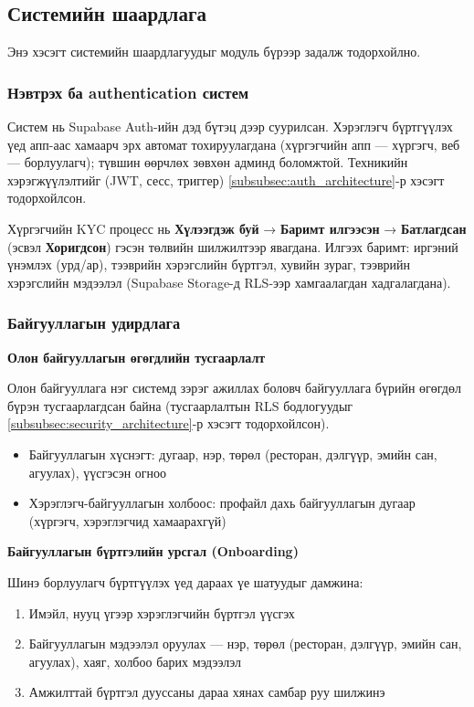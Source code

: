 \subsection{Системийн шаардлага}
\label{subsec:functional_requirements}

Энэ хэсэгт системийн шаардлагуудыг модуль бүрээр задалж тодорхойлно.

\subsubsection{Нэвтрэх ба authentication систем}

Систем нь Supabase Auth-ийн дэд бүтэц дээр суурилсан. Хэрэглэгч бүртгүүлэх үед апп-аас хамаарч эрх автомат тохируулагдана (хүргэгчийн апп — хүргэгч, веб — борлуулагч); түвшин өөрчлөх зөвхөн админд боломжтой. Техникийн хэрэгжүүлэлтийг (JWT, сесс, триггер) \ref{subsubsec:auth_architecture}-р хэсэгт тодорхойлсон.

Хүргэгчийн KYC процесс нь \textbf{Хүлээгдэж буй} → \textbf{Баримт илгээсэн} → \textbf{Батлагдсан} (эсвэл \textbf{Хоригдсон}) гэсэн төлвийн шилжилтээр явагдана. Илгээх баримт: иргэний үнэмлэх (урд/ар), тээврийн хэрэгслийн бүртгэл, хувийн зураг, тээврийн хэрэгслийн мэдээлэл (Supabase Storage-д RLS-ээр хамгаалагдан хадгалагдана).

\subsubsection{Байгууллагын удирдлага}

\textbf{Олон байгууллагын өгөгдлийн тусгаарлалт}

Олон байгууллага нэг системд зэрэг ажиллах боловч байгууллага бүрийн өгөгдөл бүрэн тусгаарлагдсан байна (тусгаарлалтын RLS бодлогуудыг \ref{subsubsec:security_architecture}-р хэсэгт тодорхойлсон).
\begin{itemize}
  \item Байгууллагын хүснэгт: дугаар, нэр, төрөл (ресторан, дэлгүүр, эмийн сан, агуулах), үүсгэсэн огноо
  \item Хэрэглэгч-байгууллагын холбоос: профайл дахь байгууллагын дугаар (хүргэгч, хэрэглэгчид хамаарахгүй)
\end{itemize}

\textbf{Байгууллагын бүртгэлийн урсгал (Onboarding)}

Шинэ борлуулагч бүртгүүлэх үед дараах үе шатуудыг дамжина:
\begin{enumerate}
  \item Имэйл, нууц үгээр хэрэглэгчийн бүртгэл үүсгэх
  \item Байгууллагын мэдээлэл оруулах — нэр, төрөл (ресторан, дэлгүүр, эмийн сан, агуулах), хаяг, холбоо барих мэдээлэл
  \item Амжилттай бүртгэл дууссаны дараа хянах самбар руу шилжинэ
\end{enumerate}

